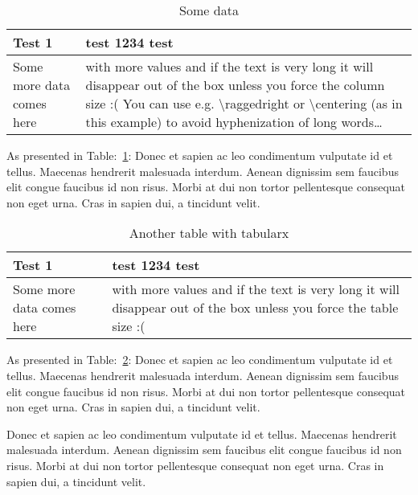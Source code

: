 \begin{table}[h]
  \centering
  \caption{Some data}%
  \vspace{-16.5pt}%
  \begin{tabular}{| l | >{\centering\arraybackslash}p{} |}
    \hline
    Test 1 & test 1234 test \\
    \hline
    Some more data comes here & with more values and if the text is very long it will disappear out of the box unless you force the column size :( You can use e.g. \textbackslash raggedright or \textbackslash centering (as in this example) to avoid hyphenization of long words\ldots \\
    \hline
  \end{tabular}
  \label{table:some_data}
\end{table}

As presented in Table:~\ref{table:some_data}: Donec et sapien ac leo condimentum vulputate id et tellus. Maecenas hendrerit malesuada interdum. Aenean dignissim sem faucibus elit congue faucibus id non risus. Morbi at dui non tortor pellentesque consequat non eget urna. Cras in sapien dui, a tincidunt velit.

\begin{table}[h]
  \centering
  \caption{Another table with tabularx}
  \begin{tabularx}{.95\textwidth}{| l | >{\centering\arraybackslash} X |}
    \hline
    Test 1 & test 1234 test \\
    \hline
    Some more data comes here & with more values and if the text is very long it will disappear out of the box unless you force the table size :( \\
    \hline
  \end{tabularx}
  \label{table:some_data2}
\end{table}

As presented in Table:~\ref{table:some_data2}: Donec et sapien ac leo condimentum vulputate id et tellus. Maecenas hendrerit malesuada interdum. Aenean dignissim sem faucibus elit congue faucibus id non risus. Morbi at dui non tortor pellentesque consequat non eget urna. Cras in sapien dui, a tincidunt velit.

Donec et sapien ac leo condimentum vulputate id et tellus. Maecenas hendrerit malesuada interdum. Aenean dignissim sem faucibus elit congue faucibus id non risus. Morbi at dui non tortor pellentesque consequat non eget urna. Cras in sapien dui, a tincidunt velit.

